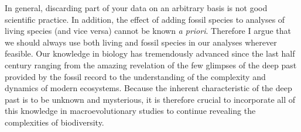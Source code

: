 In general, discarding part of your data on an arbitrary basis is not good scientific practice. 
In addition, the effect of adding fossil species to analyses of living species (and vice versa) cannot be known \textit{a priori}.
Therefore I argue that we should always use both living and fossil species in our analyses wherever feasible.
Our knowledge in biology has tremendously advanced since the last half century ranging from the amazing revelation of the few glimpses of the deep past provided by the fossil record to the understanding of the complexity and dynamics of modern ecosystems.
Because the inherent characteristic of the deep past is to be unknown and mysterious, it is therefore crucial to incorporate all of this knowledge in macroevolutionary studies to continue revealing the complexities of biodiversity.


%